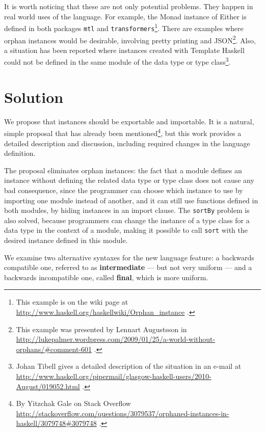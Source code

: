 \documentclass[msc]{ppgccufmg}
\begin{document}
It is worth noticing that these are not only potential problems. They
happen in real world uses of the language.  For example, the Monad
instance of Either is defined in both packages \texttt{mtl} and
\texttt{transformers}\footnote{This example is on the wiki page at
  \url{http://www.haskell.org/haskellwiki/Orphan_instance} .}.  There
are examples where orphan instances would be desirable, involving
pretty printing and JSON\footnote{This example was presented by
  Lennart Augustsson in
  \url{http://lukepalmer.wordpress.com/2009/01/25/a-world-without-orphans/\#comment-601}
  .}.  Also, a situation has been reported where instances created
with Template Haskell could not be defined in the same module of the
data type or type class\footnote{Johan Tibell gives a detailed
  description of the situation in an e-mail at
  \url{http://www.haskell.org/pipermail/glasgow-haskell-users/2010-August/019052.html}
  .}.

\chapter{Solution}


We propose that instances should be exportable and importable.  It is a natural, simple proposal that has already
been mentioned\footnote{By Yitzchak Gale on Stack Overflow
  \url{http://stackoverflow.com/questions/3079537/orphaned-instances-in-haskell/3079748\#3079748}
  .}, but this work provides a detailed description and discussion,
including required changes in the language definition.

The proposal eliminates orphan
instances: the fact that a module defines an instance without
defining the related data type or type class does not cause any bad
consequence, since the programmer can choose which instance to use
by importing one module instead of another, and it can still use
functions defined in both modules, by hiding instances in an import
clause.  The \texttt{sortBy} problem is also solved, because
programmers can change the instance of a type class for a data type in
the context of a module, making it possible to call \texttt{sort} with
the desired instance defined in this module.

We examine two alternative syntaxes for the new language feature: a
backwards compatible one, referred to as \textbf{intermediate} --- but
not very uniform --- and a backwards incompatible one, called
\textbf{final}, which is more uniform.
\end{document}
